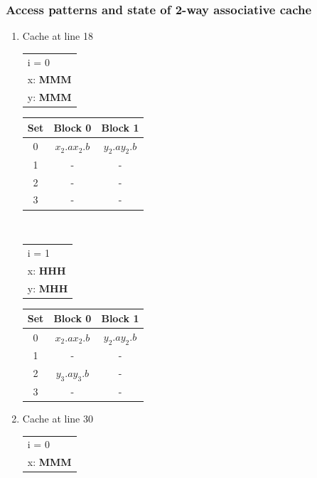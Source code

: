 \subsubsection{Access patterns and state of 2-way associative cache}
\begin{enumerate}[label=\roman*. ]
\item Cache at line 18\\
\begin{table}[h!]
    \begin{tabular}[t]{l}
        i = 0\\
        x: \textbf{MMM}\\
        y: \textbf{MMM}\\
    \end{tabular}
    \begin{tabular}[t]{|c|c|c|}
    Set & Block 0 & Block 1 \\ \hline
    0 & $x_2.a$\quad$x_2.b$ & $y_2.a$\quad$y_2.b$ \\ \hline
    1 & - & - \\ \hline
    2 & - & - \\ \hline
    3 & - & - \\ \hline
    \end{tabular}
\end{table}\\
\begin{table}[h!]
    \begin{tabular}[t]{l}
        i = 1\\
        x: \textbf{HHH}\\
        y: \textbf{MHH}\\
    \end{tabular}
    \begin{tabular}[t]{|c|c|c|}
    Set & Block 0 & Block 1 \\ \hline
    0 & $x_2.a$\quad$x_2.b$ & $y_2.a$\quad$y_2.b$ \\ \hline
    1 & - & - \\ \hline
    2 & $y_3.a$\quad$y_3.b$ & - \\ \hline
    3 & - & - \\ \hline
    \end{tabular}
\end{table}
\item Cache at line 30\\
\begin{table}[h!]
    \begin{tabular}[t]{l}
        i = 0\\
        x: \textbf{MMM}\\

\end{tabular}
\end{table}
\end{enumerate}
